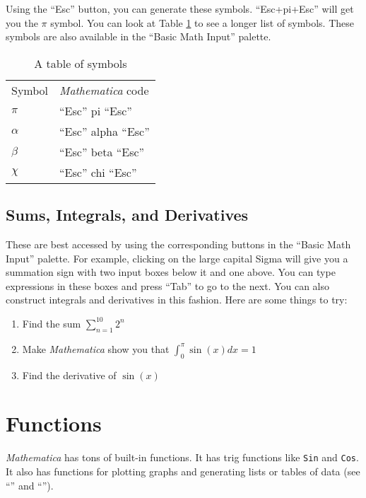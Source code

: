Using the ``Esc'' button, you can generate these symbols. ``Esc+pi+Esc'' will get you the $\pi$ symbol. You can look at Table \ref{tab:SymbolTable} to see a longer list of symbols. These symbols are also available in the ``Basic Math Input'' palette.

\begin{table}
	   \centering
	   \begin{tabular}{ll}
			 Symbol & \emph{Mathematica} code \\
			 $\pi$ & ``Esc'' pi ``Esc'' \\
			 $\alpha$ & ``Esc'' alpha ``Esc'' \\
			 $\beta$ & ``Esc'' beta ``Esc'' \\
			 $\chi$ & ``Esc'' chi ``Esc'' \\
	   \end{tabular}
	   \caption{A table of symbols}
	   \label{tab:SymbolTable}
\end{table}

\subsection{Sums, Integrals, and Derivatives}

These are best accessed by using the corresponding buttons in the ``Basic Math Input'' palette. For example, clicking on the large capital Sigma will give you a summation sign with two input boxes below it and one above. You can type expressions in these boxes and press ``Tab'' to go to the next. You can also construct integrals and derivatives in this fashion. Here are some things to try:

\begin{enumerate}
	   \item Find the sum $\sum_{n=1}^{10} 2^n$
	   \item Make \emph{Mathematica} show you that $\int_0^{\pi} \sin(x) dx = 1$
	   \item Find the derivative of $\sin(x)$
\end{enumerate}

\section{Functions}
\emph{Mathematica} has tons of built-in functions. It has trig functions like \texttt{Sin} and \texttt{Cos}. It also has functions for plotting graphs and generating lists or tables of data (see ``'' and ``'').
